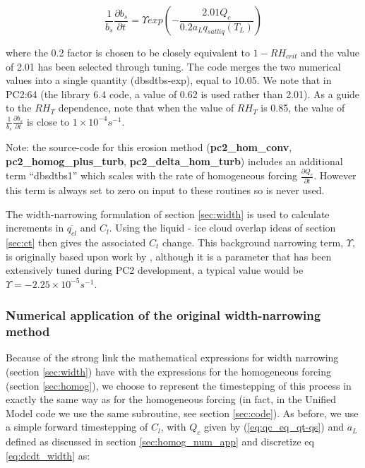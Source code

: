 \documentclass{UMDP_article}
\begin{document}
\begin{equation}
\frac{1}{b_s} \frac{\partial b_s}{\partial t} = \Upsilon exp ( - \frac{2.01 Q_c}{0.2 a_L q_{sat liq}(T_L)} )
\label{eq:dbsbydtbs_turb}
\end{equation}

where the 0.2 factor is chosen to be closely equivalent to $1 - RH_{crit}$
and the value of 2.01 has been selected through tuning. The code merges the
two numerical values into a single quantity (dbsdtbs-exp), equal to 10.05.
We note that in PC2:64
(the library 6.4 code, a value of 0.62 is used rather than 2.01). As a guide
to the $RH_T$ dependence, note
that when the value of $RH_T$ is 0.85, the value of
$\frac{1}{b_s} \frac{\partial b_s}{\partial t}$ is close to $1 \times 10^{-4} s^{-1}$.

Note: the source-code for this erosion method ({\bf pc2\_hom\_conv},
{\bf pc2\_homog\_plus\_turb}, {\bf pc2\_delta\_hom\_turb})
includes an additional term ``dbsdtbs1''
which scales with the rate of homogeneous forcing
$\frac{\partial Q_c}{\partial t}$.  However this term is always
set to zero on input to these routines so is never used.

The width-narrowing formulation of section \ref{sec:width} is used to
calculate increments in $\overline{q_{cl}}$ and $C_l$. Using the liquid -
ice cloud overlap ideas of section \ref{sec:ct} then gives the associated
$C_t$ change. This background narrowing term, $\Upsilon$, is originally based upon work
by \cite{sg03}, although it is a parameter that has been
extensively tuned during PC2 development, a typical value would be $\Upsilon=-2.25 \times 10^{-5} s^{-1}$.

\subsubsection{Numerical application of the original width-narrowing method}

Because of the strong link the mathematical expressions for width narrowing
(section \ref{sec:width}) have with the expressions for the
homogeneous forcing (section \ref{sec:homog}), we choose to represent
the timestepping of this process in exactly the same way as for
the homogeneous forcing (in fact, in the Unified Model code we use
the same subroutine, see section \ref{sec:code}). As
before, we use a simple forward timestepping of $C_l$, with
$Q_c$ given by (\ref{eq:qc_eq_qt-qs}) and $a_L$ defined as discussed
in section \ref{sec:homog_num_app} and discretize eq \ref{eq:dcdt_width} as:
\end{document}
